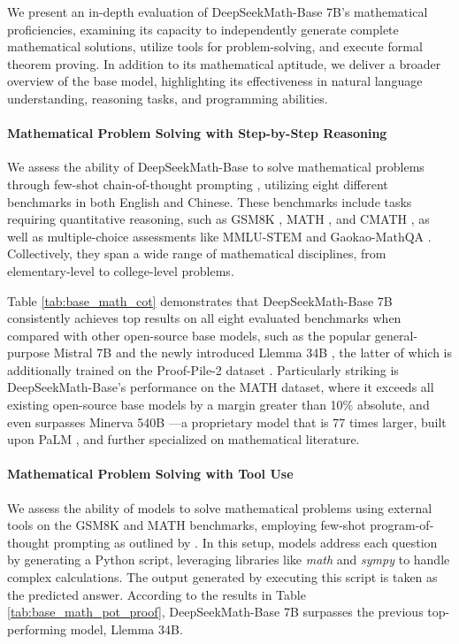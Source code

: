 \begin{itemize}[topsep=0pt]
We present an in-depth evaluation of DeepSeekMath-Base 7B’s mathematical proficiencies, examining its capacity to independently generate complete mathematical solutions, utilize tools for problem-solving, and execute formal theorem proving. In addition to its mathematical aptitude, we deliver a broader overview of the base model, highlighting its effectiveness in natural language understanding, reasoning tasks, and programming abilities.

\paragraph{Mathematical Problem Solving with Step-by-Step Reasoning}

We assess the ability of DeepSeekMath-Base to solve mathematical problems through few-shot chain-of-thought prompting \citep{cot}, utilizing eight different benchmarks in both English and Chinese. These benchmarks include tasks requiring quantitative reasoning, such as GSM8K \citep{gsm8k}, MATH \citep{MATH}, and CMATH \citep{wei2023cmath}, as well as multiple-choice assessments like MMLU-STEM \citep{mmlu} and Gaokao-MathQA \citep{agieval}. Collectively, they span a wide range of mathematical disciplines, from elementary-level to college-level problems.

Table \ref{tab:base_math_cot} demonstrates that DeepSeekMath-Base 7B consistently achieves top results on all eight evaluated benchmarks when compared with other open-source base models, such as the popular general-purpose Mistral 7B \citep{mistral} and the newly introduced Llemma 34B \citep{llemma}, the latter of which is additionally trained on the Proof-Pile-2 dataset \citep{llemma}. Particularly striking is DeepSeekMath-Base’s performance on the MATH dataset, where it exceeds all existing open-source base models by a margin greater than 10\% absolute, and even surpasses Minerva 540B \citep{minerva}—a proprietary model that is 77 times larger, built upon PaLM \citep{palm}, and further specialized on mathematical literature.

\paragraph{Mathematical Problem Solving with Tool Use} We assess the ability of models to solve mathematical problems using external tools on the GSM8K and MATH benchmarks, employing few-shot program-of-thought prompting as outlined by \citep{pot,pal}. In this setup, models address each question by generating a Python script, leveraging libraries like \textit{math} and \textit{sympy} to handle complex calculations. The output generated by executing this script is taken as the predicted answer. According to the results in Table \ref{tab:base_math_pot_proof}, DeepSeekMath-Base 7B surpasses the previous top-performing model, Llemma 34B.


\end{itemize}
